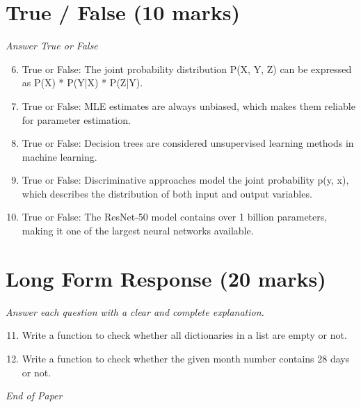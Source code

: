 \documentclass[12pt]{article}
\begin{document}
\section*{True / False (10 marks)}
\textit{Answer True or False}
\begin{enumerate}[label=\arabic*.]
\setcounter{enumi}{5}
\item True or False: The joint probability distribution P(X, Y, Z) can be expressed as P(X) * P(Y|X) * P(Z|Y).
\item True or False: MLE estimates are always unbiased, which makes them reliable for parameter estimation.
\item True or False: Decision trees are considered unsupervised learning methods in machine learning.
\item True or False: Discriminative approaches model the joint probability p(y, x), which describes the distribution of both input and output variables.
\item True or False: The ResNet-50 model contains over 1 billion parameters, making it one of the largest neural networks available.
\end{enumerate}

\section*{Long Form Response (20 marks)}
\textit{Answer each question with a clear and complete explanation.}
\begin{enumerate}[label=\arabic*.]
\setcounter{enumi}{10}
\item Write a function to check whether all dictionaries in a list are empty or not.
\item Write a function to check whether the given month number contains 28 days or not.
\end{enumerate}

\vfill
\noindent\textit{End of Paper}
\end{document}
